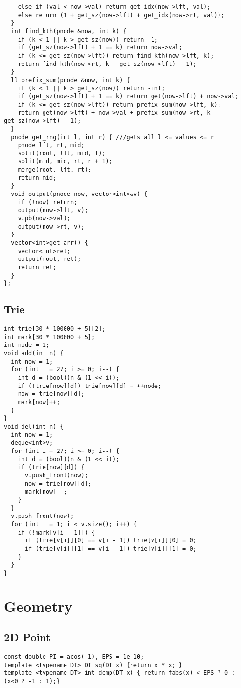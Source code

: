 \documentclass[10pt,a4paper,onesided]{article}
\begin{document}
\begin{multicols*}{3}
\begin{lstlisting}
    else if (val < now->val) return get_idx(now->lft, val);
    else return (1 + get_sz(now->lft) + get_idx(now->rt, val));
  }
  int find_kth(pnode &now, int k) {
    if (k < 1 || k > get_sz(now)) return -1;
    if (get_sz(now->lft) + 1 == k) return now->val;
    if (k <= get_sz(now->lft)) return find_kth(now->lft, k);
    return find_kth(now->rt, k - get_sz(now->lft) - 1);
  }
  ll prefix_sum(pnode &now, int k) {
    if (k < 1 || k > get_sz(now)) return -inf;
    if (get_sz(now->lft) + 1 == k) return get(now->lft) + now->val;
    if (k <= get_sz(now->lft)) return prefix_sum(now->lft, k);
    return get(now->lft) + now->val + prefix_sum(now->rt, k - get_sz(now->lft) - 1);
  }
  pnode get_rng(int l, int r) { ///gets all l <= values <= r
    pnode lft, rt, mid;
    split(root, lft, mid, l);
    split(mid, mid, rt, r + 1);
    merge(root, lft, rt);
    return mid;
  }
  void output(pnode now, vector<int>&v) {
    if (!now) return;
    output(now->lft, v);
    v.pb(now->val);
    output(now->rt, v);
  }
  vector<int>get_arr() {
    vector<int>ret;
    output(root, ret);
    return ret;
  }
};
\end{lstlisting}
\subsection{Trie}
\begin{lstlisting}
int trie[30 * 100000 + 5][2];
int mark[30 * 100000 + 5];
int node = 1;
void add(int n) {
  int now = 1;
  for (int i = 27; i >= 0; i--) {
    int d = (bool)(n & (1 << i));
    if (!trie[now][d]) trie[now][d] = ++node;
    now = trie[now][d];
    mark[now]++;
  }
}
void del(int n) {
  int now = 1;
  deque<int>v;
  for (int i = 27; i >= 0; i--) {
    int d = (bool)(n & (1 << i));
    if (trie[now][d]) {
      v.push_front(now);
      now = trie[now][d];
      mark[now]--;
    }
  }
  v.push_front(now);
  for (int i = 1; i < v.size(); i++) {
    if (!mark[v[i - 1]]) {
      if (trie[v[i]][0] == v[i - 1]) trie[v[i]][0] = 0;
      if (trie[v[i]][1] == v[i - 1]) trie[v[i]][1] = 0;
    }
  }
}
\end{lstlisting}
\section{Geometry}
\subsection{2D Point}
\begin{lstlisting}
const double PI = acos(-1), EPS = 1e-10;
template <typename DT> DT sq(DT x) {return x * x; }
template <typename DT> int dcmp(DT x) { return fabs(x) < EPS ? 0 : (x<0 ? -1 : 1);}


\end{lstlisting}
\end{multicols*}
\end{document}
